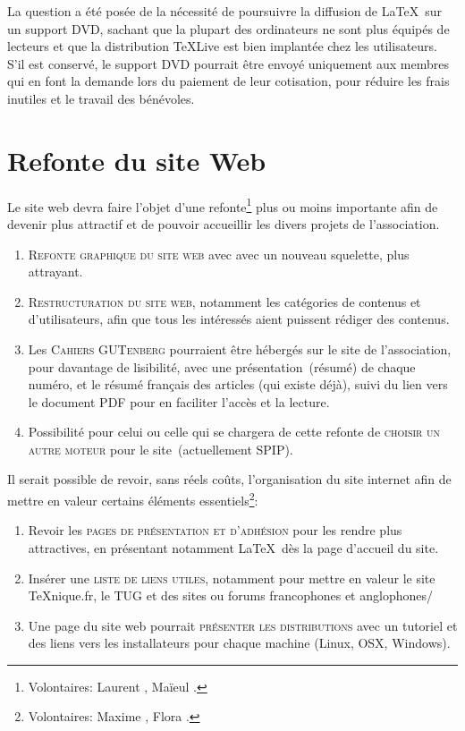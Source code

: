 \documentclass{tufte-handout}
\newcommand{\ratio}[3][]{\marginpar{\footnotesize{\textcolor{teal}{Temps requis: #2 / Utilité: #3}\par\noindent \textcolor{teal}{#1}}}}
\begin{document}
{La question a été posée\ratio[Relativement chronophage et coûteux]{++}{+} de la nécessité de poursuivre la diffusion de \LaTeX\ sur un support DVD, sachant que la plupart des ordinateurs ne sont plus équipés de lecteurs et que la distribution \TeX Live est bien implantée chez les utilisateurs. S'il est conservé, le support DVD pourrait être envoyé uniquement aux membres qui en font la demande lors du paiement de leur cotisation, pour réduire les frais inutiles et le travail des bénévoles.


\section{Refonte du site Web}

Le site web devra faire l'objet d'une refonte\ratio[Travail intense, mais limité dans le temps.]{+++}{+++}\footnote{Volontaires: Laurent , Maïeul .} plus ou moins importante afin de devenir plus attractif et de pouvoir accueillir les divers projets de l'association.

\begin{enumerate}
	\item\textsc{Refonte graphique du site web} avec avec un nouveau squelette, plus attrayant.
	\item\textsc{Restructuration du site web}, notamment les catégories de contenus et d'utilisateurs, afin que tous les intéressés aient puissent rédiger des contenus.
	\item Les \textsc{Cahiers GUTenberg} pourraient être hébergés sur le site de l'association, pour davantage de lisibilité, avec une présentation~(résumé) de chaque numéro, et le résumé français des articles (qui existe déjà), suivi du lien vers le document PDF pour en faciliter l'accès et la lecture.
	\item Possibilité pour celui ou celle qui se chargera de cette refonte de \textsc{choisir un autre moteur} pour le site~(actuellement SPIP).
\end{enumerate}

Il serait possible de revoir, sans réels coûts\ratio[Travail limité dans le temps]{+}{+++}, l'organisation du site internet afin de mettre en valeur certains éléments essentiels\footnote{Volontaires: Maxime , Flora .}:

\begin{enumerate}
	\item Revoir les \textsc{pages de présentation et d'adhésion} pour les rendre plus attractives, en présentant notamment \LaTeX\ dès la page d'accueil du site.
	\item Insérer une \textsc{liste de liens utiles}, notamment pour mettre en valeur le site \TeX nique.fr, le TUG et des sites ou forums francophones et anglophones/
	\item Une page du site web pourrait \textsc{présenter les distributions} avec un tutoriel et des liens vers les installateurs pour chaque machine (Linux, OSX, Windows).
\end{enumerate}

}
\end{document}
